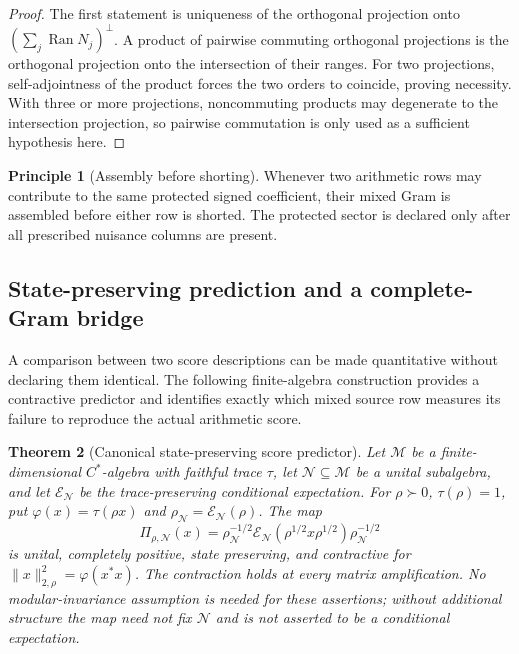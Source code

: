 \documentclass[11pt]{article}
\newtheorem{theorem}{Theorem}[section]
\theoremstyle{definition}
\newtheorem{principle}[theorem]{Principle}
\theoremstyle{remark}
\newcommand{\Ran}{\operatorname{Ran}}
\begin{document}
\begin{proof}
The first statement is uniqueness of the orthogonal projection onto
$(\sum_j\Ran N_j)^\perp$.  A product of pairwise commuting orthogonal
projections is the orthogonal projection onto the intersection of their
ranges.  For two projections, self-adjointness of the product forces the
two orders to coincide, proving necessity.  With three or more projections,
noncommuting products may degenerate to the intersection projection, so
pairwise commutation is only used as a sufficient hypothesis here.
\end{proof}

\begin{principle}[Assembly before shorting]
Whenever two arithmetic rows may contribute to the same protected signed
coefficient, their mixed Gram is assembled before either row is shorted.  The
protected sector is declared only after all prescribed nuisance columns are
present.
\end{principle}


\subsection{State-preserving prediction and a complete-Gram bridge}
\label{subsec:gran-predictor}

A comparison between two score descriptions can be made quantitative
without declaring them identical.  The following finite-algebra
construction provides a contractive predictor and identifies exactly
which mixed source row measures its failure to reproduce the actual
arithmetic score.

\begin{theorem}[Canonical state-preserving score predictor]
\label{thm:gran-petz-predictor}
Let $\mathcal M$ be a finite-dimensional $C^*$-algebra with faithful
trace $\tau$, let $\mathcal N\subseteq\mathcal M$ be a unital
subalgebra, and let $\mathcal E_{\mathcal N}$ be the trace-preserving
conditional expectation.  For $\rho\succ0$, $\tau(\rho)=1$, put
$\varphi(x)=\tau(\rho x)$ and
$\rho_{\mathcal N}=\mathcal E_{\mathcal N}(\rho)$.
The map
\begin{equation}
 \Pi_{\rho,\mathcal N}(x)=\rho_{\mathcal N}^{-1/2}
 \mathcal E_{\mathcal N}(\rho^{1/2}x\rho^{1/2})
 \rho_{\mathcal N}^{-1/2}
 \label{eq:gran-petz-predictor}
\end{equation}
is unital, completely positive, state preserving, and contractive for
$\|x\|_{2,\rho}^2=\varphi(x^*x)$.  The contraction holds at every
matrix amplification.  No modular-invariance assumption is needed for
these assertions; without additional structure the map need not fix
$\mathcal N$ and is not asserted to be a conditional expectation.
\end{theorem}
\end{document}
